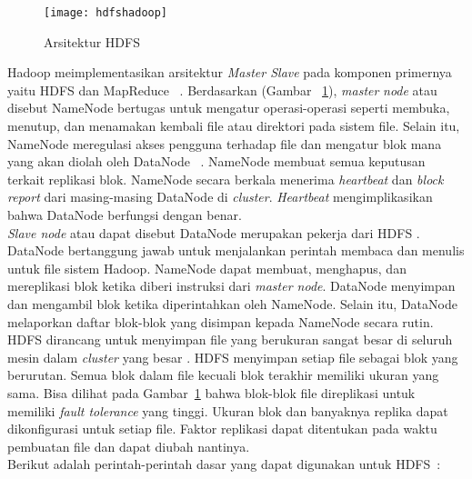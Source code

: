 \begin{figure}[H]
    \centering  
    \texttt{[image: hdfshadoop]}  
    \caption[Arsitektur HDFS]{Arsitektur HDFS} 
    \label{fig:hdfshadoop} 
\end{figure}

Hadoop meimplementasikan arsitektur \textit{Master Slave} pada komponen primernya yaitu HDFS dan MapReduce ~\cite{tomwhite:05:htdg}. Berdasarkan  (Gambar ~\ref{fig:hdfshadoop}), \textit{master} \textit{node} atau disebut NameNode bertugas untuk mengatur operasi-operasi seperti membuka, menutup, dan menamakan kembali file atau direktori pada sistem file. Selain itu, NameNode meregulasi akses pengguna terhadap file dan mengatur blok mana yang akan diolah oleh DataNode ~\cite{tomwhite:05:htdg}. NameNode membuat semua keputusan terkait replikasi blok. NameNode secara berkala menerima \textit{heartbeat} dan \textit{block report} dari masing-masing DataNode di \textit{cluster}. \textit{Heartbeat} mengimplikasikan bahwa DataNode berfungsi dengan benar.\\
	
\textit{Slave node} atau dapat disebut DataNode merupakan pekerja dari HDFS \cite{tomwhite:05:htdg}. DataNode bertanggung jawab untuk menjalankan perintah membaca dan menulis untuk file sistem Hadoop. NameNode dapat membuat, menghapus, dan mereplikasi blok ketika diberi instruksi dari \textit{master node}. DataNode menyimpan dan mengambil blok ketika diperintahkan oleh NameNode. Selain itu, DataNode melaporkan daftar blok-blok yang disimpan kepada NameNode secara rutin.\\ 

HDFS dirancang untuk menyimpan file yang berukuran sangat besar di seluruh mesin dalam \textit{cluster} yang besar \cite{tomwhite:05:htdg}. HDFS menyimpan setiap file sebagai blok yang berurutan. Semua blok dalam file kecuali blok terakhir memiliki ukuran yang sama. Bisa dilihat pada Gambar~\ref{fig:hdfshadoop} bahwa blok-blok file direplikasi untuk memiliki \textit{fault tolerance} yang tinggi. Ukuran blok dan banyaknya replika dapat dikonfigurasi untuk setiap file. Faktor replikasi dapat ditentukan pada waktu pembuatan file dan dapat diubah nantinya.\\

Berikut adalah perintah-perintah dasar yang dapat digunakan untuk HDFS~\cite{chucklam:06:hia}:

